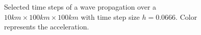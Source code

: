 
\begin{figure}
\caption{Selected time steps of a wave propagation over a $10km \times 100km \times 100km$ 
with time step size $h=0.0666$. Color represents the acceleration.}
\label{WAVE FIG 2}
\end{figure}
